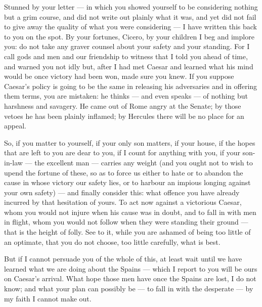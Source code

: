 

 Stunned by your letter --- in which you showed yourself to be considering nothing but a grim course, and did not write out plainly what it was, and yet did not fail to give away the quality of what you were considering --- I have written this back to you on the spot. By your fortunes, Cicero, by your children I beg and implore you: do not take any graver counsel about your safety and your standing. For I call gods and men and our friendship to witness that I told you ahead of time, and warned you not idly but, after I had met Caesar and learned what his mind would be once victory had been won, made sure you knew. If you suppose Caesar's policy is going to be the same in releasing his adversaries and in offering them terms, you are mistaken: he thinks --- and even speaks --- of nothing but harshness and savagery. He came out of Rome angry at the Senate; by those vetoes he has been plainly inflamed; by Hercules there will be no place for an appeal.

 So, if you matter to yourself, if your only son matters, if your house, if the hopes that are left to you are dear to you, if I count for anything with you, if your son-in-law --- the excellent man --- carries any weight (and you ought not to wish to upend the fortune of these, so as to force us either to hate or to abandon the cause in whose victory our safety lies, or to harbour an impious longing against your own safety) --- and finally consider this: what offence you have already incurred by that hesitation of yours. To act now against a victorious Caesar, whom you would not injure when his cause was in doubt, and to fall in with men in flight, whom you would not follow when they were standing their ground --- that is the height of folly. See to it, while you are ashamed of being too little of an optimate, that you do not choose, too little carefully, what is best.

 But if I cannot persuade you of the whole of this, at least wait until we have learned what we are doing about the Spains --- which I report to you will be ours on Caesar's arrival. What hope those men have once the Spains are lost, I do not know; and what your plan can possibly be --- to fall in with the desperate --- by my faith I cannot make out.

